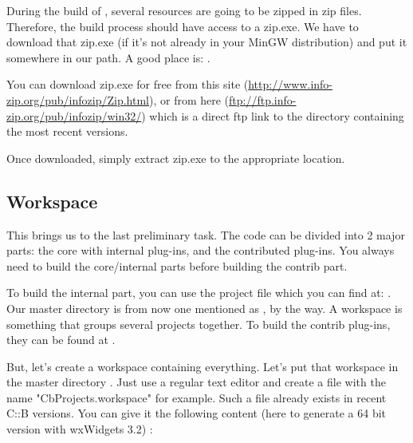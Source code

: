 During the build of \codeblocks, several resources are going to be zipped in zip files. Therefore, the build process should have access to a zip.exe. We have to download that zip.exe (if it's not already in your MinGW distribution) and put it somewhere in our path. A good place is: .

You can download zip.exe for free from this site (\url{http://www.info-zip.org/pub/infozip/Zip.html}), or from here (\url{ftp://ftp.info-zip.org/pub/infozip/win32/}) which is a direct ftp link to the directory containing the most recent versions.

Once downloaded, simply extract zip.exe to the appropriate location.

\subsection{Workspace}
This brings us to the last preliminary task. The \codeblocks code can be divided into 2 major parts: the core with internal plug-ins, and the contributed plug-ins. You always need to build the core/internal parts before building the contrib part.

To build the internal part, you can use the \codeblocks project file which you can find at: . Our \codeblocks master directory is from now one mentioned as , by the way. A workspace is something that groups several projects together. To build the contrib plug-ins, they can be found at .

But, let's create a workspace containing everything. Let's put that workspace in the master directory . Just use a regular text editor and create a file with the name "CbProjects.workspace" for example. Such a file already exists in recent C::B versions. You can give it the following content (here to generate a 64 bit version with wxWidgets 3.2) : 

